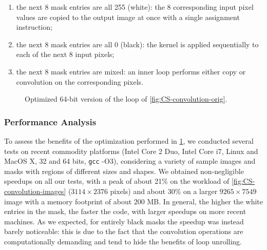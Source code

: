 \begin{enumerate}[itemsep=0pt,parsep=3pt]
\item the next 8 mask entries are all 255 (white): the 8 corresponding input pixel values are copied to the output image at once with a single assignment instruction;
\item the next 8 mask entries are all 0 (black): the kernel is applied sequentially to each of the next 8 input pixels;
\item the next 8 mask entries are mixed: an inner loop performs either copy or convolution on the corresponding pixels.
\end{enumerate}

\begin{figure}[!ht]
\centering
\cprotect{}
\vspace{-2mm}
\caption{Optimized 64-bit version of the loop of \myfigure\ref{fig:CS-convolution-orig}.}
\label{fig:CS-convolution-opt}
\end{figure}

\subsubsection*{Performance Analysis}
To assess the benefits of the optimization performed in \myfigure\ref{fig:CS-convolution-opt}, we conducted several tests on recent commodity platforms (Intel Core 2 Duo, Intel Core i7, Linux and MacOS X, 32 and 64 bits, {\tt gcc} -O3), considering a variety of sample images and masks with regions of different sizes and shapes. We obtained non-negligible speedups on all our tests, with a peak of about 21\% on the workload of \myfigure\ref{fig:CS-convolution-images} ($3114\times2376$ pixels) and about 30\% on a larger $9265\times7549$ image with a memory footprint of about 200 MB. In general, the higher the white entries in the mask, the faster the code, with larger speedups on more recent machines. As we expected, for entirely black masks the speedup was instead barely noticeable: this is due to the fact that the convolution operations are computationally demanding and tend to hide the benefits of loop unrolling.

